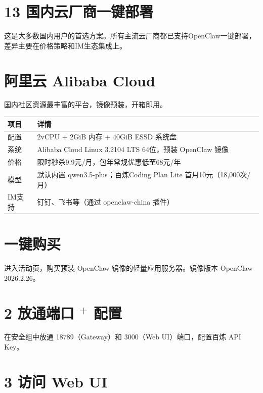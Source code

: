 \documentclass[
  10
]{article}
\newcounter{none} %
\begin{document}
\section{13
国内云厂商一键部署}\label{ux56fdux5185ux4e91ux5382ux5546ux4e00ux952eux90e8ux7f72}

这是大多数国内用户的首选方案。所有主流云厂商都已支持OpenClaw一键部署，差异主要在价格策略和IM生态集成上。

\section{阿里云 Alibaba Cloud}\label{ux963fux91ccux4e91-alibaba-cloud}

国内社区资源最丰富的平台，镜像预装，开箱即用。

{\def\LTcaptype{none} %
\begin{longtable}[]{@{}|l|l|@{}}
\toprule\noalign{}
\endhead
\bottomrule\noalign{}
\endlastfoot
\hline
项目 & 详情 \\
\hline
配置 & 2vCPU + 2GiB 内存 + 40GiB ESSD 系统盘 \\
\hline
系统 & Alibaba Cloud Linux 3.2104 LTS 64位，预装 OpenClaw 镜像 \\
\hline
价格 & 限时秒杀9.9元/月，包年常规优惠低至68元/年 \\
\hline
模型 & 默认内置 qwen3.5-plus；百炼Coding Plan Lite
首月10元（18,000次/月） \\
\hline
IM支持 & 钉钉、飞书等（通过 openclaw-china 插件） \\
\hline
\end{longtable}
}

\section{一键购买}\label{ux4e00ux952eux8d2dux4e70}

进入活动页，购买预装 OpenClaw 镜像的轻量应用服务器。镜像版本 OpenClaw
2026.2.26。

\section{\texorpdfstring{2 放通端口 \(^ +\)
配置}{2 放通端口 \^{} + 配置}}\label{ux653eux901aux7aefux53e3-ux914dux7f6e}

在安全组中放通 18789（Gateway）和 3000（Web UI）端口，配置百炼 API Key。

\section{3 访问 Web UI}\label{ux8bbfux95ee-web-ui}
\end{document}
